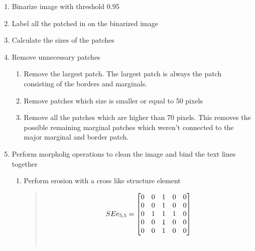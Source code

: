 \documentclass[letterpaper,10pt,english]{sphinxmanual}
\begin{document}
\begin{fulllineitems}
\begin{fulllineitems}
\begin{enumerate}
\item {} 
Binarize image with threshold 0.95

\item {} 
Label all the patched in on the binarized image

\item {} 
Calculate the sizes of the patches

\item {} 
Remove unnecessary patches
\begin{enumerate}
\item {} 
Remove the largest patch. The largest patch is always the patch consisting of the borders and marginals.

\item {} 
Remove patches which size is smaller or equal to 50 pixels

\item {} 
Remove all the patches which are higher than 70 pixels. This removes the possible remaining marginal patches which weren't connected to the major marginal and border patch.

\end{enumerate}

\item {} 
Perform morpholig operations to clean the image and bind the text lines together
\begin{enumerate}
\item {} 
Perform erosion with a cross like structure element
\begin{quote}
\begin{gather}
\begin{split}SEe_{5,5} = 
\begin{bmatrix}
        0 & 0 & 1 & 0 & 0 \\
        0 & 0 & 1 & 0 & 0 \\
        0 & 1 & 1 & 1 & 0 \\
        0 & 0 & 1 & 0 & 0 \\
        0 & 0 & 1 & 0 & 0
\end{bmatrix}\end{split}\notag\\\begin{split}\end{split}\notag
\end{gather}\end{quote}


\end{enumerate}
\end{enumerate}
\end{fulllineitems}
\end{fulllineitems}
\end{document}
